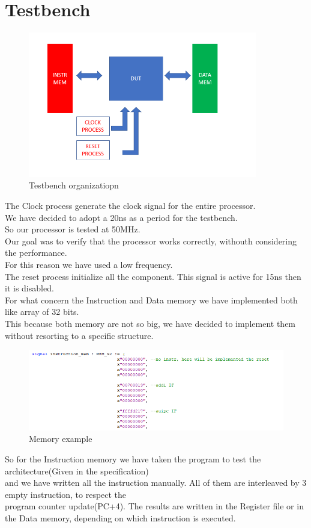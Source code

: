 \chapter{Testbench}
\begin{figure}[h!]
	\centering
	\includegraphics[width=10cm]{./images/Testbench}
	\caption{Testbench organizatiopn}
	\label{fig4.1}
\end{figure} 
The Clock process generate the clock signal for the entire processor.\\
We have decided to adopt a 20ns as a period for the testbench.\\
So our processor is tested at 50MHz. \\
Our goal was to verify that the processor works correctly, withouth considering the performance. \\
For this reason we have used a low frequency.\\
The reset process initialize all the component. This signal is active for 15ns then it is disabled.\\
For what concern the Instruction and Data memory we have implemented both like array of 32 bits.\\
This because both memory are not so big, we have decided to implement them without resorting to a specific structure.\\
\begin{figure}[h!]
	\centering
	\includegraphics[width=18cm]{./images/Imem}
	\caption{Memory example}
	\label{fig4.2}
\end{figure} 
So for the Instruction memory we have taken the program to test the architecture(Given in the specification)\\
and we have written all the instruction manually. All of them are interleaved by 3 empty instruction, to respect the\\
program counter update(PC+4).
The results are written in the Register file or in the Data memory, depending on which instruction is executed.

